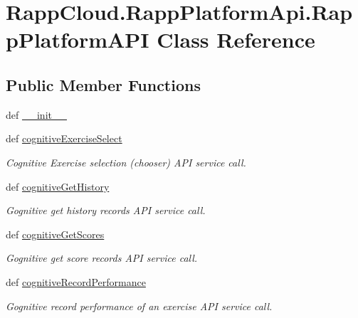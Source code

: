 \hypertarget{classRappCloud_1_1RappPlatformApi_1_1RappPlatformAPI}{\section{Rapp\-Cloud.\-Rapp\-Platform\-Api.\-Rapp\-Platform\-A\-P\-I Class Reference}
\label{classRappCloud_1_1RappPlatformApi_1_1RappPlatformAPI}
}
\subsection*{Public Member Functions}
\begin{DoxyCompactItemize}
\item 
def \hyperlink{classRappCloud_1_1RappPlatformApi_1_1RappPlatformAPI_a1099b8d879047eafcc68561aa543309a}{\-\_\-\-\_\-init\-\_\-\-\_\-}
\item 
def \hyperlink{classRappCloud_1_1RappPlatformApi_1_1RappPlatformAPI_a7bb274c785c17058dd21c80c8786eeff}{cognitive\-Exercise\-Select}
\begin{DoxyCompactList}\small\item\em Cognitive Exercise selection (chooser) A\-P\-I service call. \end{DoxyCompactList}\item 
def \hyperlink{classRappCloud_1_1RappPlatformApi_1_1RappPlatformAPI_a4ea7b4370728e0e6ac378c9178be5a23}{cognitive\-Get\-History}
\begin{DoxyCompactList}\small\item\em Gognitive get history records A\-P\-I service call. \end{DoxyCompactList}\item 
def \hyperlink{classRappCloud_1_1RappPlatformApi_1_1RappPlatformAPI_a562234e9cfb917e270ef4daab99c548b}{cognitive\-Get\-Scores}
\begin{DoxyCompactList}\small\item\em Gognitive get score records A\-P\-I service call. \end{DoxyCompactList}\item 
def \hyperlink{classRappCloud_1_1RappPlatformApi_1_1RappPlatformAPI_a6e0194674b976d6112b2f0203d7e67cb}{cognitive\-Record\-Performance}
\begin{DoxyCompactList}\small\item\em Gognitive record performance of an exercise A\-P\-I service call. \end{DoxyCompactList}\item 

\end{DoxyCompactItemize}
